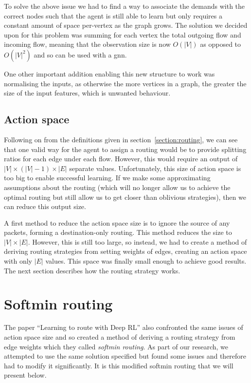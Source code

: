 To solve the above issue we had to find a way to associate the demands with the correct nodes such that the agent is still able to learn but only requires a constant amount of space per-vertex as the graph grows. The solution we decided upon for this problem was summing for each vertex the total outgoing flow and incoming flow, meaning that the observation size is now $O(|V|)$ as opposed to $O(|V|^2)$ and so can be used with a \ac{gnn}.

One other important addition enabling this new structure to work was normalising the inputs, as otherwise the more vertices in a graph, the greater the size of the input features, which is unwanted behaviour.

\subsection{Action space}
Following on from the definitions given in section~\ref{section:routing}, we can see that one valid way for the agent to assign a routing would be to provide splitting ratios for each edge under each flow. However, this would require an output of $|V|\times(|V|-1)\times|E|$ separate values. Unfortunately, this size of action space is too big to enable successful learning. If we make some approximating assumptions about the routing (which will no longer allow us to achieve the optimal routing but still allow us to get closer than oblivious strategies), then we can reduce this output size.

A first method to reduce the action space size is to ignore the source of any packets, forming a destination-only routing. This method reduces the size to $|V|\times|E|$. However, this is still too large, so instead, we had to create a method of deriving routing strategies from setting weights of edges, creating an action space with only $|E|$ values. This space was finally small enough to achieve good results. The next section describes how the routing strategy works.

\section{Softmin routing}
The paper \enquote{Learning to route with Deep RL}\cite{valadarsky2017learning} also confronted the same issues of action space size and so created a method of deriving a routing strategy from edge weights which they called \emph{softmin routing}. As part of our research, we attempted to use the same solution specified but found some issues and therefore had to modify it significantly. It is this modified softmin routing that we will present below.

